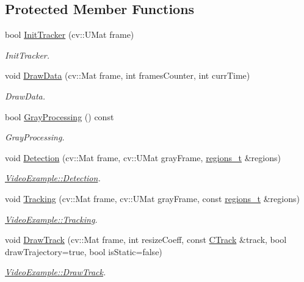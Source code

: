 \subsection*{Protected Member Functions}
\begin{DoxyCompactItemize}
\item 
bool \mbox{\hyperlink{class_yolo_example_a60980995a54b8bcfcf94bd4e04d0eeaa}{Init\+Tracker}} (cv\+::\+U\+Mat frame)
\begin{DoxyCompactList}\small\item\em Init\+Tracker. \end{DoxyCompactList}\item 
void \mbox{\hyperlink{class_yolo_example_a1e5a542fbec653a1579ac6d5ed6dea4b}{Draw\+Data}} (cv\+::\+Mat frame, int frames\+Counter, int curr\+Time)
\begin{DoxyCompactList}\small\item\em Draw\+Data. \end{DoxyCompactList}\item 
bool \mbox{\hyperlink{class_yolo_example_aec0d91a32770f9a351d635c30ae54826}{Gray\+Processing}} () const
\begin{DoxyCompactList}\small\item\em Gray\+Processing. \end{DoxyCompactList}\item 
void \mbox{\hyperlink{class_video_example_a5ea4a212997371399b01aed1d59a80b8}{Detection}} (cv\+::\+Mat frame, cv\+::\+U\+Mat gray\+Frame, \mbox{\hyperlink{defines_8h_a01db0de56a20f4342820a093c5154536}{regions\+\_\+t}} \&regions)
\begin{DoxyCompactList}\small\item\em \mbox{\hyperlink{class_video_example_a5ea4a212997371399b01aed1d59a80b8}{Video\+Example\+::\+Detection}}. \end{DoxyCompactList}\item 
void \mbox{\hyperlink{class_video_example_af412482dcaad532d958dc31b362ee1c2}{Tracking}} (cv\+::\+Mat frame, cv\+::\+U\+Mat gray\+Frame, const \mbox{\hyperlink{defines_8h_a01db0de56a20f4342820a093c5154536}{regions\+\_\+t}} \&regions)
\begin{DoxyCompactList}\small\item\em \mbox{\hyperlink{class_video_example_af412482dcaad532d958dc31b362ee1c2}{Video\+Example\+::\+Tracking}}. \end{DoxyCompactList}\item 
void \mbox{\hyperlink{class_video_example_a84a040bc87b915c5ee18c5d11235f40c}{Draw\+Track}} (cv\+::\+Mat frame, int resize\+Coeff, const \mbox{\hyperlink{class_c_track}{C\+Track}} \&track, bool draw\+Trajectory=true, bool is\+Static=false)
\begin{DoxyCompactList}\small\item\em \mbox{\hyperlink{class_video_example_a84a040bc87b915c5ee18c5d11235f40c}{Video\+Example\+::\+Draw\+Track}}. \end{DoxyCompactList}\end{DoxyCompactItemize}
